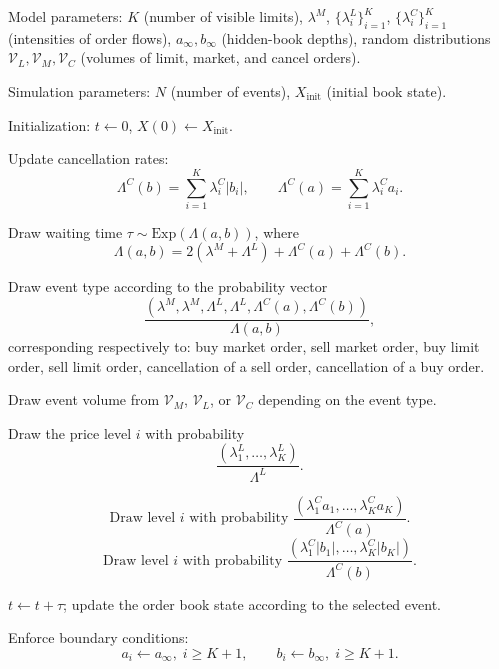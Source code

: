 \label{alg:poisson_lob}
\begin{algorithmic}[1]
\Require 
Model parameters: $K$ (number of visible limits), $\lambda^{M}$, 
$\{\lambda^{L}_{i}\}_{i=1}^{K}$, $\{\lambda^{C}_{i}\}_{i=1}^{K}$ (intensities of order flows), 
$a_{\infty}, b_{\infty}$ (hidden-book depths), random distributions 
$\mathcal{V}_{L}, \mathcal{V}_{M}, \mathcal{V}_{C}$ (volumes of limit, market, and cancel orders).

Simulation parameters: $N$ (number of events), $X_{\text{init}}$ (initial book state).

\State Initialization: $t \gets 0$, $X(0) \gets X_{\text{init}}$.


    \State Update cancellation rates:
    \[
    \Lambda^{C}(b) = \sum_{i=1}^{K} \lambda^{C}_{i} |b_{i}|, \qquad 
    \Lambda^{C}(a) = \sum_{i=1}^{K} \lambda^{C}_{i} a_{i}.
    \]

    \State Draw waiting time $\tau \sim \mathrm{Exp}(\Lambda(a,b))$, where
    \[
    \Lambda(a,b) = 2(\lambda^{M} + \Lambda^{L}) + \Lambda^{C}(a) + \Lambda^{C}(b).
    \]

    \State Draw event type according to the probability vector
    \[
    \frac{(\lambda^{M}, \lambda^{M}, \Lambda^{L}, \Lambda^{L}, \Lambda^{C}(a), \Lambda^{C}(b))}
         {\Lambda(a,b)},
    \]
    corresponding respectively to: buy market order, sell market order, buy limit order,
    sell limit order, cancellation of a sell order, cancellation of a buy order.

    \State Draw event volume from $\mathcal{V}_{M}$, $\mathcal{V}_{L}$, or $\mathcal{V}_{C}$ 
    depending on the event type.

        \State Draw the price level $i$ with probability 
        \[
        \frac{(\lambda^{L}_{1}, \ldots, \lambda^{L}_{K})}{\Lambda^{L}}.
        \]
    \EndIf

        \[
        \text{Draw level $i$ with probability } 
        \frac{(\lambda^{C}_{1} a_{1}, \ldots, \lambda^{C}_{K} a_{K})}{\Lambda^{C}(a)}.
        \]
        \Else
        \[
        \text{Draw level $i$ with probability }
        \frac{(\lambda^{C}_{1} |b_{1}|, \ldots, \lambda^{C}_{K} |b_{K}|)}{\Lambda^{C}(b)}.
        \]
        \EndIf
    \EndIf

    \State $t \gets t + \tau$; update the order book state according to the selected event.

    \State Enforce boundary conditions:
    \[
    a_{i} \gets a_{\infty}, \; i \ge K+1, \qquad 
    b_{i} \gets b_{\infty}, \; i \ge K+1.
    \]

\EndFor
\end{algorithmic}

